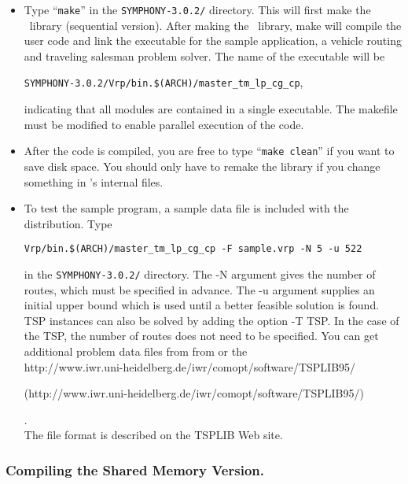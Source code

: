 \begin{itemize}
        \item Type ``{\tt make}'' in the {\tt SYMPHONY-3.0.2/} directory. This will
first make the \BB\ library (sequential version). After making the \BB\
library, make will compile the user code and link the executable for the
sample application, a vehicle routing and traveling salesman problem
solver. The name of the executable will be 
\begin{center}
{\tt SYMPHONY-3.0.2/Vrp/bin.\$(ARCH)/master\_tm\_lp\_cg\_cp}, 
\end{center}
indicating that all
modules are contained in a single executable. The makefile must be modified to
enable parallel execution of the code.

\item After the code is compiled, you are free to type ``{\tt make
        clean}'' if you want to save disk space. You
        should only have to remake the library if you change something
        in \BB's internal files.

\item To test the sample program, a sample data file is included with the
distribution. Type 
\begin{center}
{\tt Vrp/bin.\$(ARCH)/master\_tm\_lp\_cg\_cp -F sample.vrp
-N 5 -u 522} 
\end{center}
in the {\tt SYMPHONY-3.0.2/} directory. The -N argument gives the number
of routes, which must be specified in advance. The -u argument supplies an
initial upper bound which is used until a better feasible solution is
found. TSP instances can also be solved by adding the option -T TSP. In the
case of the TSP, the number of routes does not need to be specified. You can
get additional problem data files from from  or the
\\ 
{http://www.iwr.uni-heidelberg.de/iwr/comopt/software/TSPLIB95/}
\begin{latexonly}
        (http://www.iwr.uni-heidelberg.de/iwr/comopt/software/TSPLIB95/)
\end{latexonly}. \\
The file
format is described on the TSPLIB Web site.
\end{itemize}

\subsubsection{Compiling the Shared Memory Version.}

